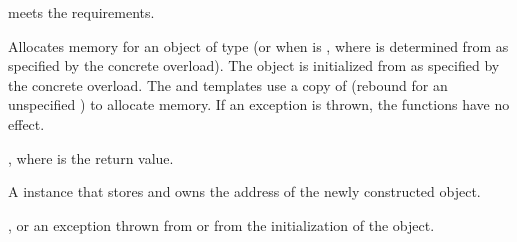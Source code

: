 \begin{itemdescr}
\pnum
\expects
{} meets
the  requirements.

\pnum
\effects
Allocates memory for an object of type 
(or  when  is ,
where  is determined from  as specified by the concrete overload).
The object is initialized from  as specified by the concrete overload.
The  and  templates
use a copy of 
(rebound for an unspecified ) to allocate memory.
If an exception is thrown, the functions have no effect.

\pnum
\ensures
{},
where  is the return value.

\pnum
\returns
A  instance that stores and owns the address of
the newly constructed object.

\pnum
\throws
{}, or
an exception thrown from  or from the initialization of the object.


\end{itemdescr}
